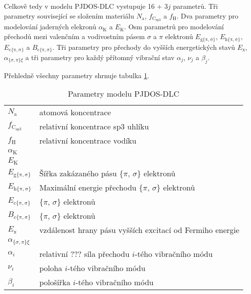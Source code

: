 Celkově tedy v modelu PJDOS-DLC vystupuje 16 + 3$j$ parametrů. Tři parametry související se složením materiálu $N_\mathrm{a}$, $f_\mathrm{C_{sp3}}$ a $f_\mathrm{H}$. Dva parametry pro modelování jaderných elekronů $\alpha_\mathrm{K}$ a $E_\mathrm{K}$. Osm parametrů pro modelování přechodů mezi valenčním a vodivostním pásem $\sigma$ a $\pi$ elektronů $E_\mathrm{g\{\pi,\sigma\}}$, $E_\mathrm{h\{\pi,\sigma\}}$, $E_\mathrm{c\{\pi,\sigma\}}$ a $B_\mathrm{c\{\pi,\sigma\}}$. Tři parametry pro přechody do vyšších energetických stavů $E_\mathrm{x}$, $\alpha_{\{\sigma,\pi\}\xi}$ a tři parametry pro každý přítomný vibrační stav $\alpha_j$, $\nu_j$ a $\beta_j$.

Přehledně všechny parametry shrnuje tabulka \ref{DLCparametry}.

\begin{table}
\centering
\begin{tabular}{l l}
\hline
$N_\mathrm{a}$ & atomová koncentrace \\
$f_\mathrm{C_{sp3}}$ & relativní koncentrace sp3 uhlíku \\
$f_\mathrm{H}$ & relativní koncentrace vodíku \\

$\alpha_\mathrm{K}$ & \\
$E_\mathrm{K}$ & \\

$E_\mathrm{g\{\pi,\sigma\}}$ & Šířka zakázaného pásu \{$\pi$, $\sigma$\} elektronů\\
$E_\mathrm{h\{\pi,\sigma\}}$ & Maximální energie přechodu \{$\pi$, $\sigma$\} elektronů\\
$E_\mathrm{c\{\pi,\sigma\}}$ &  \{$\pi$, $\sigma$\} elektronů\\
$B_\mathrm{c\{\pi,\sigma\}}$ &  \{$\pi$, $\sigma$\} elektronů\\

$E_\mathrm{x}$ & vzdálenost hrany pásu vyšších excitací od Fermiho energie\\
$\alpha_{\{\sigma,\pi\}\xi}$ & \\

$\alpha_i$ & relativní ??? síla přechodu $i$-tého vibračního módu \\
$\nu_i$ & poloha $i$-tého vibračního módu\\
$\beta_i$ & pološířka $i$-tého vibračního módu\\




\hline

\end{tabular}
\label{DLCparametry}
\caption{Parametry modelu PJDOS-DLC}
\end{table}

